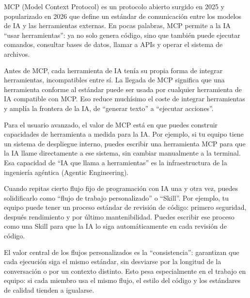 


MCP (Model Context Protocol) es un protocolo abierto surgido en 2025 y popularizado en 2026 que define un estándar de comunicación entre los modelos de IA y las herramientas externas. En pocas palabras, MCP permite a la IA “usar herramientas”: ya no solo genera código, sino que también puede ejecutar comandos, consultar bases de datos, llamar a APIs y operar el sistema de archivos.

Antes de MCP, cada herramienta de IA tenía su propia forma de integrar herramientas, incompatibles entre sí. La llegada de MCP significa que una herramienta conforme al estándar puede ser usada por cualquier herramienta de IA compatible con MCP. Eso reduce muchísimo el coste de integrar herramientas y amplía la frontera de la IA, de “generar texto” a “ejecutar acciones”.

Para el usuario avanzado, el valor de MCP está en que puedes construir capacidades de herramienta a medida para la IA. Por ejemplo, si tu equipo tiene un sistema de despliegue interno, puedes escribir una herramienta MCP para que la IA llame directamente a ese sistema, sin cambiar manualmente a la terminal. Esa capacidad de “IA que llama a herramientas” es la infraestructura de la ingeniería agéntica (Agentic Engineering).


Cuando repitas cierto flujo fijo de programación con IA una y otra vez, puedes solidificarlo como “flujo de trabajo personalizado” o “Skill”. Por ejemplo, tu equipo puede tener un proceso estándar de revisión de código: primero seguridad, después rendimiento y por último mantenibilidad. Puedes escribir ese proceso como una Skill para que la IA lo siga automáticamente en cada revisión de código.

El valor central de los flujos personalizados es la “consistencia”: garantizan que cada ejecución siga el mismo estándar, sin desviarse por la longitud de la conversación o por un contexto distinto. Esto pesa especialmente en el trabajo en equipo: si cada miembro usa el mismo flujo, el estilo del código y los estándares de calidad tienden a igualarse.

